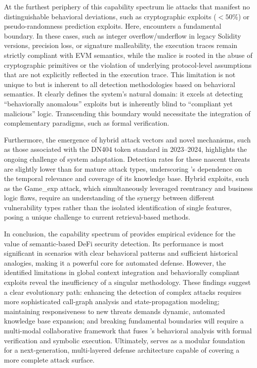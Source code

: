 At the furthest periphery of this capability spectrum lie attacks that manifest no distinguishable behavioral deviations, such as cryptographic exploits ($<50\%$) or pseudo-randomness prediction exploits. Here, \approach{} encounters a fundamental boundary. In these cases, such as integer overflow/underflow in legacy Solidity versions, precision loss, or signature malleability, the execution traces remain strictly compliant with EVM semantics, while the malice is rooted in the abuse of cryptographic primitives or the violation of underlying protocol-level assumptions that are not explicitly reflected in the execution trace. This limitation is not unique to \approach{} but is inherent to all detection methodologies based on behavioral semantics. It clearly defines the system's natural domain: it excels at detecting ``behaviorally anomalous'' exploits but is inherently blind to ``compliant yet malicious'' logic. Transcending this boundary would necessitate the integration of complementary paradigms, such as formal verification.


Furthermore, the emergence of hybrid attack vectors and novel mechanisms, such as those associated with the DN404 token standard in 2023--2024, highlights the ongoing challenge of system adaptation. Detection rates for these nascent threats are slightly lower than for mature attack types, underscoring \approach{}’s dependence on the temporal relevance and coverage of its knowledge base. Hybrid exploits, such as the Game\_exp attack, which simultaneously leveraged reentrancy and business logic flaws, require an understanding of the synergy between different vulnerability types rather than the isolated identification of single features, posing a unique challenge to current retrieval-based methods.

In conclusion, the capability spectrum of \approach{} provides empirical evidence for the value of semantic-based DeFi security detection. Its performance is most significant in scenarios with clear behavioral patterns and sufficient historical analogies, making it a powerful core for automated defense. However, the identified limitations in global context integration and behaviorally compliant exploits reveal the insufficiency of a singular methodology. These findings suggest a clear evolutionary path: enhancing the detection of complex attacks requires more sophisticated call-graph analysis and state-propagation modeling; maintaining responsiveness to new threats demands dynamic, automated knowledge base expansion; and breaking fundamental boundaries will require a multi-modal collaborative framework that fuses \approach{}’s behavioral analysis with formal verification and symbolic execution. Ultimately, \approach{} serves as a modular foundation for a next-generation, multi-layered defense architecture capable of covering a more complete attack surface.
